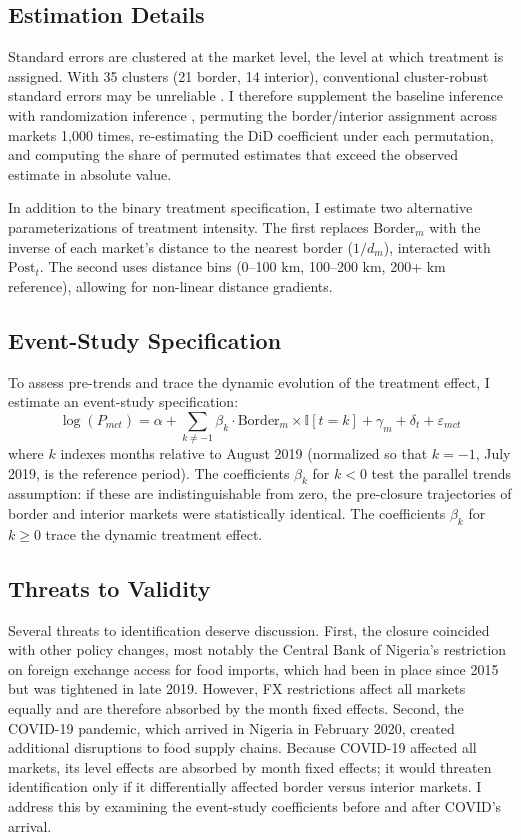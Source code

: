 \documentclass[12pt]{article}
\newcommand{\ind}{\mathbb{I}}
\begin{document}
\subsection{Estimation Details}

Standard errors are clustered at the market level, the level at which treatment is assigned. With 35 clusters (21 border, 14 interior), conventional cluster-robust standard errors may be unreliable \citep{cameron2008bootstrap}. I therefore supplement the baseline inference with randomization inference \citep{fisher1932test}, permuting the border/interior assignment across markets 1,000 times, re-estimating the DiD coefficient under each permutation, and computing the share of permuted estimates that exceed the observed estimate in absolute value.

In addition to the binary treatment specification, I estimate two alternative parameterizations of treatment intensity. The first replaces $\text{Border}_m$ with the inverse of each market's distance to the nearest border ($1/d_m$), interacted with $\text{Post}_t$. The second uses distance bins (0--100 km, 100--200 km, 200+ km reference), allowing for non-linear distance gradients.

\subsection{Event-Study Specification}

To assess pre-trends and trace the dynamic evolution of the treatment effect, I estimate an event-study specification:
\begin{equation}
\label{eq:event}
\log(P_{mct}) = \alpha + \sum_{k \neq -1} \beta_k \cdot \text{Border}_m \times \ind[t = k] + \gamma_m + \delta_t + \varepsilon_{mct}
\end{equation}
where $k$ indexes months relative to August 2019 (normalized so that $k = -1$, July 2019, is the reference period). The coefficients $\beta_k$ for $k < 0$ test the parallel trends assumption: if these are indistinguishable from zero, the pre-closure trajectories of border and interior markets were statistically identical. The coefficients $\beta_k$ for $k \geq 0$ trace the dynamic treatment effect.

\subsection{Threats to Validity}

Several threats to identification deserve discussion. First, the closure coincided with other policy changes, most notably the Central Bank of Nigeria's restriction on foreign exchange access for food imports, which had been in place since 2015 but was tightened in late 2019. However, FX restrictions affect all markets equally and are therefore absorbed by the month fixed effects. Second, the COVID-19 pandemic, which arrived in Nigeria in February 2020, created additional disruptions to food supply chains. Because COVID-19 affected all markets, its level effects are absorbed by month fixed effects; it would threaten identification only if it differentially affected border versus interior markets. I address this by examining the event-study coefficients before and after COVID's arrival.
\end{document}
